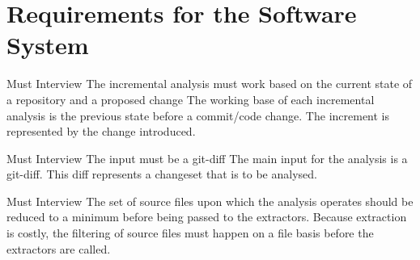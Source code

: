 \documentclass[a4paper]{article}
\begin{document}
\newpage
\lhead{{}}
\rhead{\leftmark}
\pagestyle{fancy}

\listoftodos[Notes]
\clearpage

\tableofcontents
\newpage


\maketitle
\newpage

\setcounter{page}{1}
\lhead{{}}
\rhead{\leftmark}
\pagestyle{fancy}

\section{Requirements for the Software System}

\begin{req}
	\reqtable
	{Must}  {Interview}
	{The incremental analysis must work based on the current state of a repository and a proposed change}
	{The working base of each incremental analysis is the previous state before a commit/code change. The increment is represented by the change introduced.}
	
	\begin{subreq} \label{req:git-diff}
		\reqtable
		{Must}  {Interview}
		{The input must be a git-diff}
		{The main input for the analysis is a git-diff. This diff represents a changeset that is to be analysed.}
	\end{subreq}
\end{req}


\begin{req} \label{req:early-filtering}
\reqtable
	{Must}  {Interview}
	{The set of source files upon which the analysis operates should be reduced to a minimum before being passed to the extractors.}
	{Because extraction is costly, the filtering of source files must happen on a file basis before the extractors are called.}
\end{req}
\end{document}
